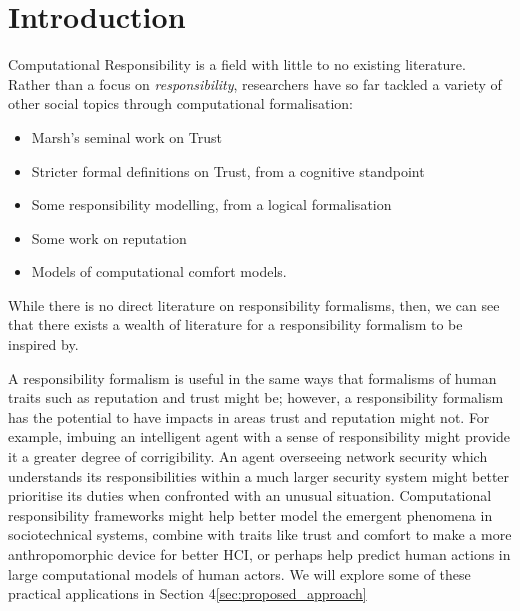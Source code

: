 \section{Introduction}\label{sec:intro}

Computational Responsibility is a field with little to no existing literature. Rather than a focus on \emph{responsibility}, researchers have so far tackled a variety of other social topics through computational formalisation:

\begin{itemize}
    \item Marsh's seminal work on Trust\cite{Marsh1994FormalisingConcept}
    
    \item Stricter formal definitions on Trust, from a cognitive standpoint\cite{CastelfranchiSocialApproach}
    
    \item Some responsibility modelling, from a logical formalisation\cite{Simpson2015FormalisingAnalysis}
    
    \item Some work on reputation~\cite{Chandrasekaran2011ASystems}

    \item Models of computational comfort models\cite{Marsh2011}.
    
\end{itemize}

While there is no direct literature on responsibility formalisms, then, we can see that there exists a wealth of literature for a responsibility formalism to be inspired by.\par

A responsibility formalism is useful in the same ways that formalisms of human traits such as reputation and trust might be; however, a responsibility formalism has the potential to have impacts in areas trust and reputation might not. For example, imbuing an intelligent agent with a sense of responsibility might provide it a greater degree of corrigibility\cite{corrigibility}. An agent overseeing network security which understands its responsibilities within a much larger security system might better prioritise its duties when confronted with an unusual situation. Computational responsibility frameworks might help better model the emergent phenomena in sociotechnical systems, combine with traits like trust and comfort to make a more anthropomorphic device for better HCI, or perhaps help predict human actions in large computational models of human actors. We will explore some of these practical applications in Section 4\ref{sec:proposed_approach}


